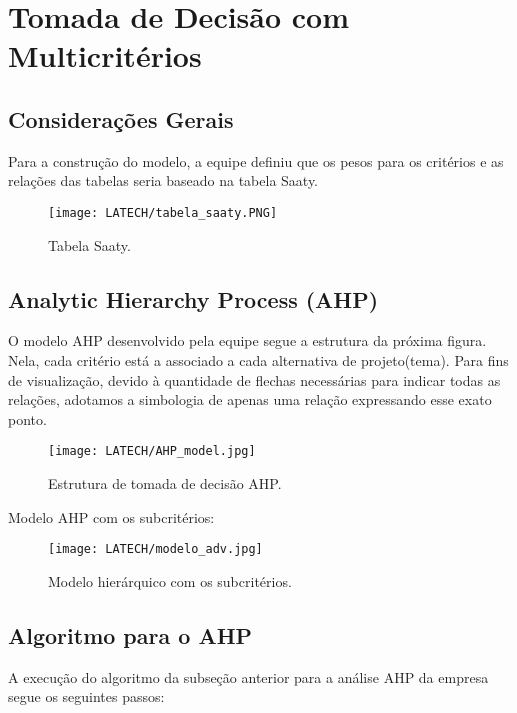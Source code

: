 \documentclass[onecolumn,11pt]{asme2ej}
\begin{document}
\section{Tomada de Decisão com Multicritérios}

\subsection{Considerações Gerais}

Para a construção do modelo, a equipe definiu que os pesos para os critérios e as relações das tabelas seria baseado na tabela Saaty.

\FloatBarrier
\begin{figure}[h]
    \centering
    \texttt{[image: LATECH/tabela\_saaty.PNG]}
    \caption{Tabela Saaty.}
    \label{fig:sat}
\end{figure}
\FloatBarrier

\subsection{Analytic Hierarchy Process (AHP)}

O modelo AHP desenvolvido pela equipe segue a estrutura da próxima figura. Nela, cada critério está a associado a cada alternativa de projeto(tema). Para fins de visualização, devido à quantidade de flechas necessárias para indicar todas as relações, adotamos a simbologia de apenas uma relação expressando esse exato ponto.

\FloatBarrier
\begin{figure}[h]
    \centering
    \texttt{[image: LATECH/AHP\_model.jpg]}
    \caption{Estrutura de tomada de decisão AHP.}
    \label{fig:ahp_model}
\end{figure}
\FloatBarrier

Modelo AHP com os subcritérios:

\FloatBarrier
\begin{figure}[h]
    \centering
    \texttt{[image: LATECH/modelo\_adv.jpg]}
    \caption{Modelo hierárquico com os subcritérios.}
    \label{fig:model_adv}
\end{figure}
\FloatBarrier

\subsection{Algoritmo para o AHP}

A execução do algoritmo da subseção anterior para a análise AHP da empresa segue os seguintes passos:
\end{document}
